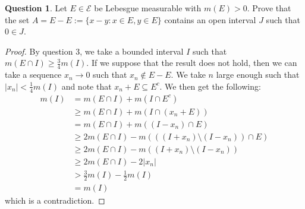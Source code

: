 \documentclass{article}
\theoremstyle{definition} %
\numberwithin{thm}{section} %
\theoremstyle{definition} %
\newtheorem{question}[thm]{Question}
\begin{document}
\begin{question}
Let $E \in \mathcal{E}$ be Lebesgue measurable with $m(E) > 0$. Prove that the set $A = E - E := \{x - y : x \in E, y \in E\}$ contains an open interval $J$ such that $0 \in J$.
\end{question}
\begin{proof}
By question 3, we take a bounded interval $I$ such that $m(E \cap I) \geq \frac{3}{4}m(I)$. If we suppose that the result does not hold, then we can take a sequence $x_n \to 0$ such that $x_n \notin E - E$. We take $n$ large enough such that $|x_n| < \frac{1}{4}m(I)$ and note that $x_n + E \subseteq E^c$. We then get the following:
\begin{align*}
    m(I)
    &= m(E \cap I) + m(I \cap E^c) \\
    &\geq m(E \cap I) + m(I \cap (x_n + E)) \\
    &= m(E \cap I) + m((I - x_n) \cap E) \\
    &\geq 2m(E \cap I) - m(((I + x_n) \setminus (I - x_n)) \cap E) \\
    &\geq 2m(E \cap I) - m((I + x_n) \setminus (I - x_n)) \\
    &\geq 2m(E \cap I) - 2|x_n| \\
    &> \frac{3}{2}m(I) - \frac{1}{2}m(I) \\
    &= m(I)
\end{align*}
which is a contradiction.
\end{proof}
\end{document}
